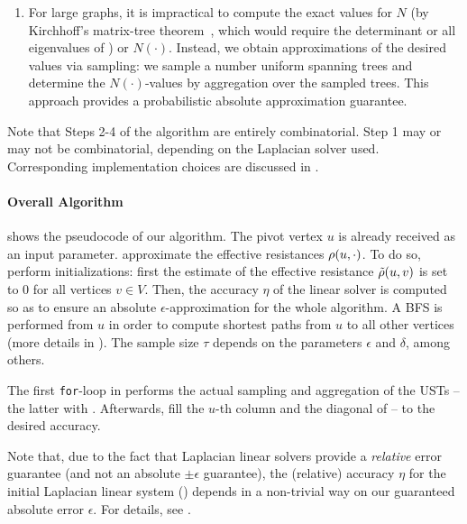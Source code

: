 \begin{enumerate}
\item For large graphs, it is impractical to compute the exact values for $N$
(\eg by Kirchhoff's matrix-tree theorem~\cite{DBLP:books/daglib/0037866},
which would require the determinant or all eigenvalues of \Linv) or
$N(\cdot)$. Instead, we obtain approximations of the desired values via sampling:
we sample a number uniform spanning trees and determine the $N(\cdot)$-values by
aggregation over the sampled trees. This approach provides a probabilistic absolute
approximation guarantee.
\end{enumerate}

Note that Steps 2-4 of the algorithm are entirely combinatorial. Step 1 may or may not be
combinatorial, depending on the Laplacian solver used. Corresponding implementation choices
are discussed in .



\paragraph{Overall Algorithm}
 shows the pseudocode of our algorithm. The pivot vertex $u$ is already
received as an input parameter. 
approximate the effective resistances $\rho(u, \cdot)$. To do so,
 perform initializations:
first the estimate of the effective resistance $\tilde{\rho}(u, v)$ is set to 0 for all vertices $v \in V$.
Then, the accuracy $\eta$ of the linear solver is computed so as to ensure an absolute
$\epsilon$-approximation for the whole algorithm. A BFS is performed from $u$ in order to compute
shortest paths from $u$ to all other vertices (more details in ).
The sample size $\tau$ depends on the parameters $\epsilon$ and $\delta$, among others.

The first \texttt{for}-loop in  performs the actual sampling
and aggregation of the USTs -- the latter with .
Afterwards, 
fill the $u$-th column and the diagonal of \Linv -- to the desired accuracy.

\begin{remark}
Note that, due to the fact that Laplacian linear solvers provide a \emph{relative}
error guarantee (and not an absolute $\pm\epsilon$ guarantee), the (relative)
accuracy $\eta$ for the initial Laplacian linear system
() depends in a non-trivial way
on our guaranteed absolute error $\epsilon$. For details, see
\cite[Appendix A.4]{DBLP:conf/esa/AngrimanPGM20}.
\end{remark}

